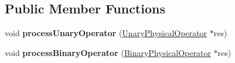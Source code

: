 \subsection*{Public Member Functions}
\begin{DoxyCompactItemize}
\item 
\hypertarget{class_cloning_physical_operator_visitor_ac57b783d90f26dd8c1a9418aab5ab2a6}{void {\bfseries process\+Unary\+Operator} (\hyperlink{class_unary_physical_operator}{Unary\+Physical\+Operator} $\ast$res)}\label{class_cloning_physical_operator_visitor_ac57b783d90f26dd8c1a9418aab5ab2a6}

\item 
\hypertarget{class_cloning_physical_operator_visitor_a47cf1dcc2e5dedb2328f66676de4102b}{void {\bfseries process\+Binary\+Operator} (\hyperlink{class_binary_physical_operator}{Binary\+Physical\+Operator} $\ast$res)}\label{class_cloning_physical_operator_visitor_a47cf1dcc2e5dedb2328f66676de4102b}


\end{DoxyCompactItemize}
